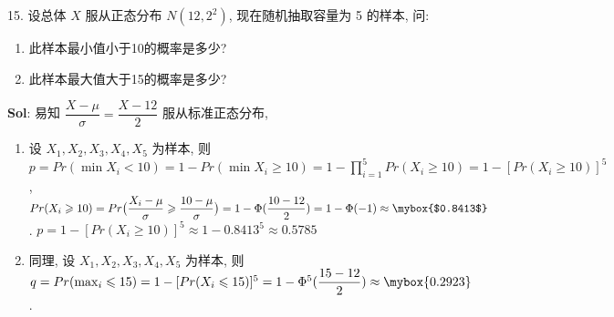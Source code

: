 \vspace{12pt}

15. 设总体 $X$ 服从正态分布 $N(12,2^2)$, 现在随机抽取容量为 5 的样本, 问:
\begin{enumerate}
    \item 此样本最小值小于10的概率是多少?
    \item 此样本最大值大于15的概率是多少?
\end{enumerate}

\textbf{Sol}: 易知 $\dfrac{X-\mu}{\sigma}=\dfrac{X-12}{2}$ 服从标准正态分布,
\begin{enumerate}
    \item 设 $X_1,X_2,X_3,X_4,X_5$ 为样本, 
    则 $p=Pr(\min X_i<10)=1-Pr(\min X_i\geqslant 10)=1-\prod_{i=1}^5Pr(X_i\geqslant10)=1-[Pr(X_i\geqslant10)]^5$,
    $Pr(X_i\geqslant10)=Pr\big(\dfrac{X_i-\mu}{\sigma}\geqslant\dfrac{10-\mu}{\sigma}\big)=1-\Phi(\dfrac{10-12}{2})=1-\Phi(-1)\approx\mybox{$0.8413$}$. 
    $p=1-[Pr(X_i\geqslant10)]^5\approx 1- 0.8413^5\approx 0.5785$
    \item 同理, 设 $X_1,X_2,X_3,X_4,X_5$ 为样本, 则
    $q=Pr(\max_i\leqslant 15)=1-[Pr(X_i\leqslant 15)]^5=1-\Phi^5(\dfrac{15-12}{2})\approx\mybox{0.2923}$.
\end{enumerate}



